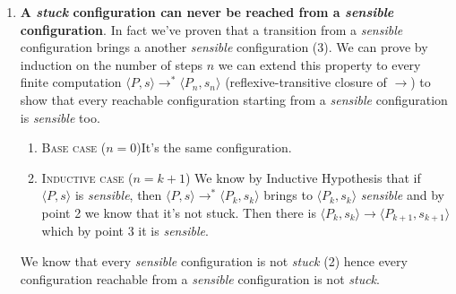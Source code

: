 \begin{solution}
\begin{enumerate}
\begin{enumerate}
\begin{enumerate}
                 Assume $\langle \text{if }B \text{ then }C_1 \text{ else }C_2, s\rangle$ \textit{sensible}, i.e. $Loc(B) \cup Loc(C_1) \cup Loc(C_2) \subseteq dom(s)$.
                \\
                By Inductive Hypothesis (IH) for $\langle B,s\rangle \to \langle B', s'\rangle$ we have that $\langle B', s'\rangle$ is \textit{sensible}, i.e. $Loc(B') \subseteq dom(s') $ and $dom(s') = dom(s)$.
                \\
                Since $Loc(C_1) \cup Loc(C_2) \subseteq dom(s) $ and $dom(s') = dom(s)$, $Loc(C_1) \cup Loc(C_2)\subseteq dom(s') $.
                \\
                Hence $Loc(C_1) \cup Loc(C_2)\subseteq dom(s')$ and $Loc(B') \subseteq dom(s') $ thus $Loc(C_1') \cup Loc(C_2) \cup Loc(B') \subseteq dom(s') = dom(s)$ so the resulting configuration is \textit{sensible}.
            \end{enumerate}
    \end{enumerate}
    \item \textbf{A \textit{stuck} configuration can never be reached from a \textit{sensible} configuration}. In fact we've proven that a transition from a \textit{sensible} configuration brings a another \textit{sensible} configuration (3).  We can prove by induction on the number of steps $n$ we can extend this property to every finite computation $\langle P,s\rangle \to^* \langle P_n, s_n\rangle$ (reflexive-transitive closure of $\to$)  to show that every reachable configuration starting from a \textit{sensible} configuration is \textit{sensible} too.
    \begin{enumerate}
        \item \textsc{Base case} ($n =0$)It's the same configuration.
        \item \textsc{Inductive case} ($n=k+1$) We know by Inductive Hypothesis that if $\langle P,s\rangle$ is \textit{sensible}, then $\langle P,s\rangle \to^*  \langle P_k, s_k\rangle$ brings to  $\langle P_k, s_k\rangle$ \textit{sensible} and by point 2 we know that it's not stuck. Then there is $\langle P_k, s_k\rangle \to \langle P_{k+1}, s_{k+1}\rangle $ which by point 3 it is \textit{sensible}.  
    \end{enumerate}
    We know that every \textit{sensible} configuration is not \textit{stuck} (2) hence every configuration reachable from a \textit{sensible} configuration is not \textit{stuck}.

\end{enumerate}
\end{solution}